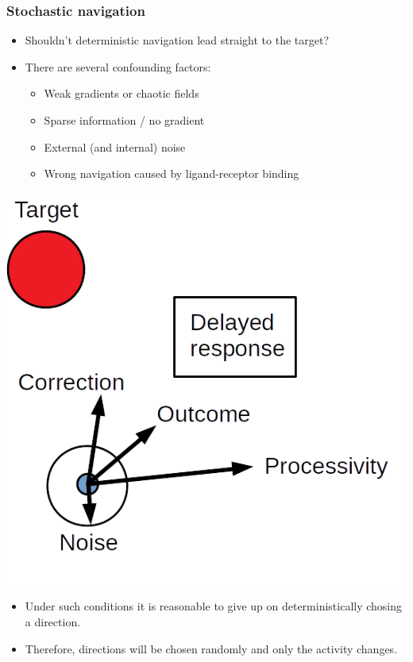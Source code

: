 \documentclass[11pt]{beamer}
\begin{document}
\begin{frame}
 \frametitle{Stochastic navigation}
 \begin{minipage}[h]{0.59\textwidth}
  \begin{itemize}
   \item Shouldn't deterministic navigation lead straight to the target?
   \item There are several confounding factors:
   \begin{itemize}
    \item Weak gradients or chaotic fields
    \item Sparse information / no gradient
    \item External (and internal) noise
    \item Wrong navigation caused by ligand-receptor binding
   \end{itemize}

  \end{itemize}
 \end{minipage}
\begin{minipage}[h]{0.4\textwidth}
 \centering
 \includegraphics[width=\textwidth]{gfx/chemotrouble.png}
\end{minipage}
\begin{itemize}
 \item Under such conditions it is reasonable to give up on deterministically chosing a direction.
 \item Therefore, directions will be chosen randomly and only the activity changes.
\end{itemize}


 
\end{frame}
\end{document}
